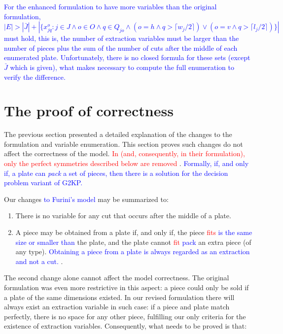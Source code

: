 \documentclass[ppgc,tese,english,formais,babel]{iiufrgs}
\newif\iffinalversion
\newcommand{\newtext}[1]{\iffinalversion%
#1%
\else%
\textcolor{blue}{#1}%
\fi%
}
\newcommand{\oldtext}[1]{\iffinalversion%
\else%
\textcolor{red}{#1}%
\fi%
}
\begin{document}
\newtext{
For the enhanced formulation to have more variables than the original formulation, \(|E| > |\bar{J}| + |\{x^o_{jq} : j \in J \land o \in O \land q \in Q_{jo} \land (o = h \land q > \lceil w_j / 2 \rceil) \lor (o = v \land q > \lceil l_j / 2 \rceil)\}|\) must hold, this is, the number of extraction variables must be larger than the number of pieces plus the sum of the number of cuts after the middle of each enumerated plate.
Unfortunately, there is no closed formula for these sets (except \(\bar{J}\) which is given), what makes necessary to compute the full enumeration to verify the difference.
}


\section{The proof of correctness}

The previous section presented a detailed explanation of the changes to the formulation and variable enumeration.
This section proves such changes do not affect the correctness of the model.
\oldtext{In \citet{furini:2016} (and, consequently, in their formulation), only the perfect symmetries described below are removed}.
\newtext{Formally, if, and only if, a plate can \emph{pack} a set of pieces, then there is a solution for the decision problem variant of G2KP.}
Our changes \newtext{to Furini's model} may be summarized to:

\begin{enumerate}
\item There is no variable for any cut that occurs after the middle of a plate.
\item A piece may be obtained from a plate if, and only if, the piece \oldtext{fits}\newtext{is the same size or smaller than} the plate, and the plate cannot \oldtext{fit}\newtext{pack} an extra piece (of any type). \newtext{Obtaining a piece from a plate is always regarded as an extraction and not a cut.}.
\end{enumerate}

The second change alone cannot affect the model correctness.
The original formulation was even more restrictive in this aspect:
a piece could only be sold if a plate of the same dimensions existed.
In our revised formulation there will always exist an extraction variable in such case:
if a piece and plate match perfectly, there is no space for any other piece, fulfilling our only criteria for the existence of extraction variables.
Consequently, what needs to be proved is that:
\end{document}
